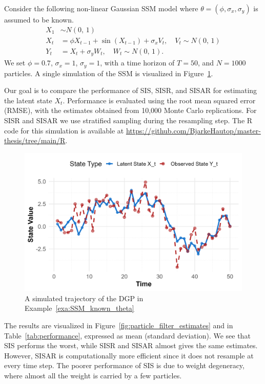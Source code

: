 \begin{example}
	\label{exa:SSM_known_theta}
	Consider the following non-linear Gaussian SSM model where $\theta=(\phi, \sigma_x,\sigma_y)$ is assumed to be known. 
	\begin{align*}
		X_1 &\sim N(0,\, 1) \\
		X_t&=\phi X_{t-1}+\sin(X_{t-1})+\sigma_x V_t, \quad V_t \sim N(0, \, 1) \\
		Y_t&=X_t+\sigma_y W_t, \quad W_t \sim N(0, \, 1).
	\end{align*}
	We set $\phi=0.7$, $\sigma_x=1$, $\sigma_y=1$, with a time horizon of $T=50$, and $N=1000$ particles. 
	A single simulation of the SSM is visualized in Figure~\ref{fig:hidden_obs_known_theta}.
	
	Our goal is to compare the performance of SIS, SISR, and SISAR for estimating the latent state $X_t$. Performance is evaluated using the root mean squared error (RMSE), with the estimates obtained from 10,000 Monte Carlo replications. For SISR and SISAR we use stratified sampling during the resampling step. The R code for this simulation is available at \url{https://github.com/BjarkeHautop/master-thesis/tree/main/R}.
	
	\begin{figure}
		\centering
		\includegraphics{Latent_obs_example3.1.png}
		\caption{A simulated trajectory of the \gls*{DGP} in Example~\ref{exa:SSM_known_theta}}
		\label{fig:hidden_obs_known_theta}
	\end{figure}	
	The results are visualized in Figure~\ref{fig:particle_filter_estimates} and in Table~\ref{tab:performance}, expressed as mean (standard deviation). We see that SIS performs the worst, while SISR and SISAR almost gives the same estimates. However, SISAR is computationally more efficient since it does not resample at every time step. The poorer performance of SIS is due to weight degeneracy, where almost all the weight is carried by a few particles.
	

\end{example}
